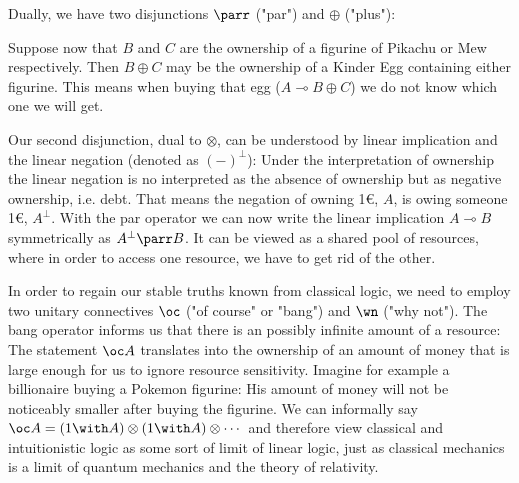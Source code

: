 \documentclass[DIN, pagenumber=false, fontsize=11pt, parskip=half, colorinlistoftodos, svgnames]{scrartcl}
\begin{document}
	Dually, we have two disjunctions $\parr$ ("par") and $\oplus$ ("plus"):
	
	Suppose now that $B$ and $C$ are the ownership of a figurine of Pikachu or Mew respectively. 
	Then $B \oplus C$ may be the ownership of a Kinder Egg containing either figurine. 
	This means when buying that egg ($A \multimap B \oplus C$) we do not know which one we will get. 
	
	Our second disjunction, dual to $\otimes$, can be understood by linear implication and the linear negation (denoted as $(-)^\bot$): 
	Under the interpretation of ownership the linear negation is no interpreted as the absence of ownership but as negative ownership, i.e. debt. 
	That means the negation of owning 1\euro, $A$, is owing someone 1\euro, $A^\bot$. 
	With the par operator we can now write the linear implication $A \multimap B$ symmetrically as $A^\bot \parr B$. 
	It can be viewed as a shared pool of resources, where in order to access one resource, we have to get rid of the other.
	
	In order to regain our stable truths known from classical logic, we need to employ two unitary connectives $\oc$ ("of course" or "bang") and $\wn$ ("why not"). 
	The bang operator informs us that there is an possibly infinite amount of a resource: 
	The statement $\oc A$ translates into the ownership of an amount of money that is large enough for us to ignore resource sensitivity. 
	Imagine for example a billionaire buying a Pokemon figurine: His amount of money will not be noticeably smaller after buying the figurine. We can informally say $\oc A = (1 \with A) \otimes (1 \with A) \otimes \cdots $ and therefore view classical and intuitionistic logic as some sort of limit of linear logic, just as classical mechanics is a limit of quantum mechanics and the theory of relativity. 
	
	
\end{document}
